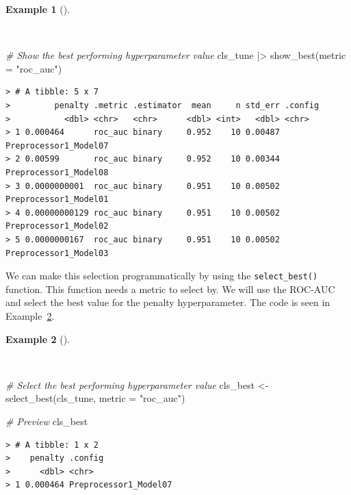 \documentclass[
  letterpaper,
]{latex/krantz}
\newenvironment{Shaded}{\begin{snugshade}}{\end{snugshade}}
\newcommand{\AttributeTok}[1]{\textcolor[rgb]{0.00,0.00,0.00}{#1}}
\newcommand{\CommentTok}[1]{\textcolor[rgb]{0.00,0.00,0.00}{\textit{#1}}}
\newcommand{\FunctionTok}[1]{\textcolor[rgb]{0.00,0.00,0.00}{#1}}
\newcommand{\NormalTok}[1]{\textcolor[rgb]{0.00,0.00,0.00}{#1}}
\newcommand{\OtherTok}[1]{\textcolor[rgb]{0.00,0.00,0.00}{#1}}
\newcommand{\SpecialCharTok}[1]{\textcolor[rgb]{0.00,0.00,0.00}{#1}}
\newcommand{\StringTok}[1]{\textcolor[rgb]{0.00,0.00,0.00}{#1}}
\theoremstyle{definition}
\newtheorem{example}{Example}[chapter]
\theoremstyle{remark}
\begin{document}
\begin{example}[]\protect\hypertarget{exm-pda-class-model-spec-tune-grid-collect-best}{}\label{exm-pda-class-model-spec-tune-grid-collect-best}

~

\begin{Shaded}
\begin{Highlighting}[]
\CommentTok{\# Show the best performing hyperparameter value}
\NormalTok{cls\_tune }\SpecialCharTok{|\textgreater{}}
  \FunctionTok{show\_best}\NormalTok{(}\AttributeTok{metric =} \StringTok{"roc\_auc"}\NormalTok{)}
\end{Highlighting}
\end{Shaded}

\begin{verbatim}
> # A tibble: 5 x 7
>         penalty .metric .estimator  mean     n std_err .config              
>           <dbl> <chr>   <chr>      <dbl> <int>   <dbl> <chr>                
> 1 0.000464      roc_auc binary     0.952    10 0.00487 Preprocessor1_Model07
> 2 0.00599       roc_auc binary     0.952    10 0.00344 Preprocessor1_Model08
> 3 0.0000000001  roc_auc binary     0.951    10 0.00502 Preprocessor1_Model01
> 4 0.00000000129 roc_auc binary     0.951    10 0.00502 Preprocessor1_Model02
> 5 0.0000000167  roc_auc binary     0.951    10 0.00502 Preprocessor1_Model03
\end{verbatim}

\end{example}

We can make this selection programmatically by using the
\texttt{select\_best()} function. This function needs a metric to select
by. We will use the ROC-AUC and select the best value for the penalty
hyperparameter. The code is seen in
Example~\ref{exm-pda-class-model-spec-tune-grid-collect-select}.

\begin{example}[]\protect\hypertarget{exm-pda-class-model-spec-tune-grid-collect-select}{}\label{exm-pda-class-model-spec-tune-grid-collect-select}

~

\begin{Shaded}
\begin{Highlighting}[]
\CommentTok{\# Select the best performing hyperparameter value}
\NormalTok{cls\_best }\OtherTok{\textless{}{-}}
  \FunctionTok{select\_best}\NormalTok{(cls\_tune, }\AttributeTok{metric =} \StringTok{"roc\_auc"}\NormalTok{)}

\CommentTok{\# Preview}
\NormalTok{cls\_best}
\end{Highlighting}
\end{Shaded}

\begin{verbatim}
> # A tibble: 1 x 2
>    penalty .config              
>      <dbl> <chr>                
> 1 0.000464 Preprocessor1_Model07
\end{verbatim}

\end{example}
\end{document}
